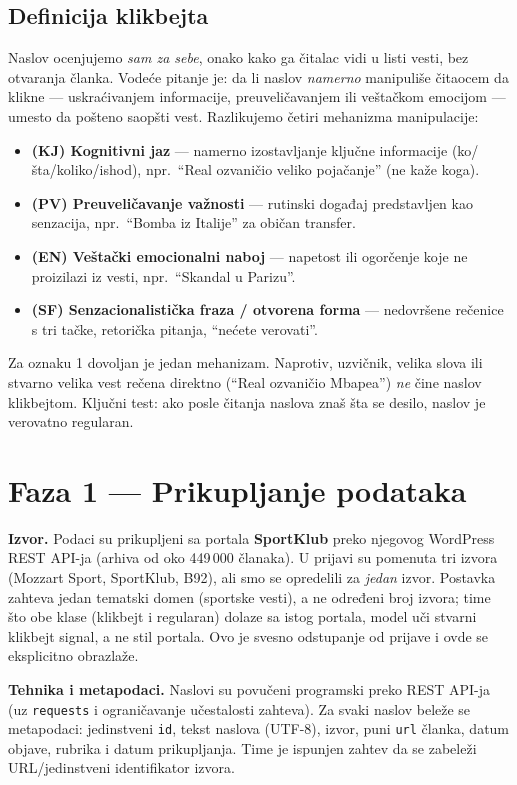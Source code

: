 \documentclass[11pt,a4paper]{article}
\begin{document}
\subsection{Definicija klikbejta}
Naslov ocenjujemo \emph{sam za sebe}, onako kako ga čitalac vidi u listi vesti, bez
otvaranja članka. Vodeće pitanje je: da li naslov \emph{namerno} manipuliše čitaocem
da klikne --- uskraćivanjem informacije, preuveličavanjem ili veštačkom emocijom ---
umesto da pošteno saopšti vest. Razlikujemo četiri mehanizma manipulacije:
\begin{itemize}
  \item \textbf{(KJ) Kognitivni jaz} --- namerno izostavljanje ključne informacije
    (ko/šta/koliko/ishod), npr.\ \enquote{Real ozvaničio veliko pojačanje} (ne kaže koga).
  \item \textbf{(PV) Preuveličavanje važnosti} --- rutinski događaj predstavljen kao
    senzacija, npr.\ \enquote{Bomba iz Italije} za običan transfer.
  \item \textbf{(EN) Veštački emocionalni naboj} --- napetost ili ogorčenje koje ne
    proizilazi iz vesti, npr.\ \enquote{Skandal u Parizu}.
  \item \textbf{(SF) Senzacionalistička fraza / otvorena forma} --- nedovršene
    rečenice s tri tačke, retorička pitanja, \enquote{nećete verovati}.
\end{itemize}
Za oznaku 1 dovoljan je jedan mehanizam. Naprotiv, uzvičnik, velika slova ili
stvarno velika vest rečena direktno (\enquote{Real ozvaničio Mbapea}) \emph{ne} čine
naslov klikbejtom. Ključni test: ako posle čitanja naslova znaš šta se desilo,
naslov je verovatno regularan.

\section{Faza 1 --- Prikupljanje podataka}\label{sec:faza1}
\textbf{Izvor.} Podaci su prikupljeni sa portala \textbf{SportKlub} preko njegovog
WordPress REST API-ja (arhiva od oko 449\,000 članaka). U prijavi su pomenuta tri
izvora (Mozzart Sport, SportKlub, B92), ali smo se opredelili za \emph{jedan} izvor.
Postavka zahteva jedan tematski domen (sportske vesti), a ne određeni broj izvora;
time što obe klase (klikbejt i regularan) dolaze sa istog portala, model uči stvarni
klikbejt signal, a ne stil portala. Ovo je svesno odstupanje od prijave i ovde se
eksplicitno obrazlaže.

\textbf{Tehnika i metapodaci.} Naslovi su povučeni programski preko REST API-ja
(uz \texttt{requests} i ograničavanje učestalosti zahteva). Za svaki naslov beleže
se metapodaci: jedinstveni \texttt{id}, tekst naslova (UTF-8), izvor, puni
\texttt{url} članka, datum objave, rubrika i datum prikupljanja. Time je ispunjen
zahtev da se zabeleži URL/jedinstveni identifikator izvora.
\end{document}
